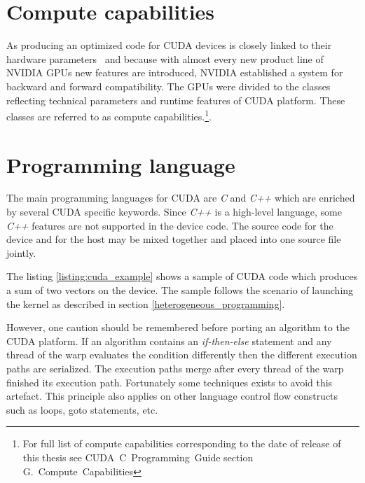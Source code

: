 \documentclass[12pt,oneside]{fithesis2}
\begin{document}
\section{Compute capabilities}

As producing an optimized code for CUDA devices is closely linked to their hardware parameters~\cite{cuda_best_practices} and because with almost every new product line of NVIDIA GPUs new features are introduced, NVIDIA established a system for backward and forward compatibility. The GPUs were divided to the classes reflecting technical parameters and runtime features of CUDA platform. These classes are referred to as compute capabilities.\footnote{For full list of compute capabilities corresponding to the date of release of this thesis see CUDA~C~Programming~Guide \cite{cuda_guide} section G.~Compute~Capabilities}.

\section{Programming language}
\label{cuda_lang}

The main programming languages for CUDA are \emph{C} and \emph{C++} which are enriched by several CUDA specific keywords. Since \emph{C++} is a high-level language, some \emph{C++} features are not supported in the device code. The source code for the device and for the host may be mixed together and placed into one source file jointly.~\cite{cuda_guide}

The listing \ref{listing:cuda_example} shows a sample of CUDA code which produces a sum of two vectors on the device. The sample follows the scenario of launching the kernel as described in section \ref{heterogeneous_programming}.

However, one caution should be remembered before porting an algorithm to the CUDA platform. If an algorithm contains an \emph{if-then-else} statement and any thread of the warp evaluates the condition differently then the different execution paths are serialized. The execution paths merge after every thread of the warp finished its execution path. Fortunately some techniques exists to avoid this artefact. This principle also applies on other language control flow constructs such as loops, goto statements, etc.~\cite{cuda_guide}
\end{document}
